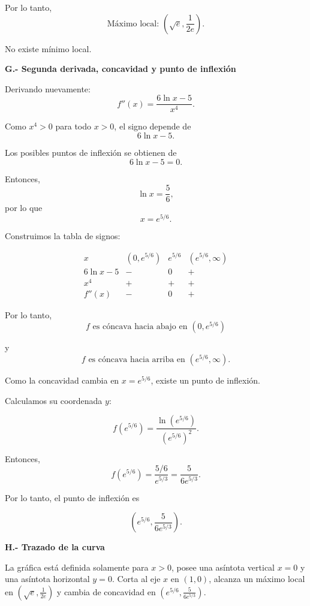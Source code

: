 \documentclass[12pt]{article}
\begin{document}
\begin{enumerate}[label=\alph*.-]
    Por lo tanto,
    \[
    \boxed{
    \text{Máximo local: }
    \left(\sqrt e,\frac{1}{2e}\right)
    }.
    \]

    No existe mínimo local.

    \textbf{G.- Segunda derivada, concavidad y punto de inflexión}

    Derivando nuevamente:
    \[
    f''(x)
    =
    \frac{6\ln x-5}{x^4}.
    \]

    Como $x^4>0$ para todo $x>0$, el signo depende de
    \[
    6\ln x-5.
    \]

    Los posibles puntos de inflexión se obtienen de
    \[
    6\ln x-5=0.
    \]

    Entonces,
    \[
    \ln x=\frac56,
    \]
    por lo que
    \[
    x=e^{5/6}.
    \]

    Construimos la tabla de signos:

    \[
    \begin{array}{c|ccc}
    x & (0,e^{5/6}) & e^{5/6} & (e^{5/6},\infty)\\
    \hline
    6\ln x-5 & - & 0 & +\\
    x^4 & + & + & +\\
    \hline
    f''(x) & - & 0 & +
    \end{array}
    \]

    Por lo tanto,
    \[
    \boxed{
    f\text{ es cóncava hacia abajo en }(0,e^{5/6})
    }
    \]

    y
    \[
    \boxed{
    f\text{ es cóncava hacia arriba en }(e^{5/6},\infty).
    }
    \]

    Como la concavidad cambia en $x=e^{5/6}$, existe un punto
    de inflexión.

    Calculamos su coordenada $y$:

    \[
    f(e^{5/6})
    =
    \frac{\ln(e^{5/6})}{(e^{5/6})^2}.
    \]

    Entonces,
    \[
    f(e^{5/6})
    =
    \frac{5/6}{e^{5/3}}
    =
    \frac{5}{6e^{5/3}}.
    \]

    Por lo tanto, el punto de inflexión es

    \[
    \boxed{
    \left(e^{5/6},\frac{5}{6e^{5/3}}\right)
    }.
    \]

    \textbf{H.- Trazado de la curva}

    La gráfica está definida solamente para $x>0$, posee una asíntota
    vertical $x=0$ y una asíntota horizontal $y=0$. Corta al eje $x$
    en $(1,0)$, alcanza un máximo local en
    $\left(\sqrt e,\frac{1}{2e}\right)$ y cambia de concavidad en
    $\left(e^{5/6},\frac{5}{6e^{5/3}}\right)$.


\end{enumerate}
\end{document}
